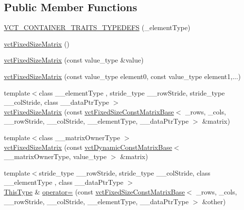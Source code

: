 \subsection*{Public Member Functions}
\begin{DoxyCompactItemize}
\item 
\hyperlink{classvct_fixed_size_matrix_a78c5d283ff740706b19aa20a26f2aa72}{V\-C\-T\-\_\-\-C\-O\-N\-T\-A\-I\-N\-E\-R\-\_\-\-T\-R\-A\-I\-T\-S\-\_\-\-T\-Y\-P\-E\-D\-E\-F\-S} (\-\_\-element\-Type)
\item 
\hyperlink{classvct_fixed_size_matrix_a8e739eb559d9d6e89327760d4d730dc6}{vct\-Fixed\-Size\-Matrix} ()
\item 
\hyperlink{classvct_fixed_size_matrix_ab1a36da72bbaa940a6ecb8b5948cefd5}{vct\-Fixed\-Size\-Matrix} (const value\-\_\-type \&value)
\item 
\hyperlink{classvct_fixed_size_matrix_adb59d89c0f4e11f97357682f5063457b}{vct\-Fixed\-Size\-Matrix} (const value\-\_\-type element0, const value\-\_\-type element1,...)
\item 
{\footnotesize template$<$class \-\_\-\-\_\-element\-Type , stride\-\_\-type \-\_\-\-\_\-row\-Stride, stride\-\_\-type \-\_\-\-\_\-col\-Stride, class \-\_\-\-\_\-data\-Ptr\-Type $>$ }\\\hyperlink{classvct_fixed_size_matrix_a98b4158359ed5e4cb02c41a19b0c39a1}{vct\-Fixed\-Size\-Matrix} (const \hyperlink{classvct_fixed_size_const_matrix_base}{vct\-Fixed\-Size\-Const\-Matrix\-Base}$<$ \-\_\-rows, \-\_\-cols, \-\_\-\-\_\-row\-Stride, \-\_\-\-\_\-col\-Stride, \-\_\-\-\_\-element\-Type, \-\_\-\-\_\-data\-Ptr\-Type $>$ \&matrix)
\item 
{\footnotesize template$<$class \-\_\-\-\_\-matrix\-Owner\-Type $>$ }\\\hyperlink{classvct_fixed_size_matrix_a4dcca7d8dfa0b09c2421c3a8929446c1}{vct\-Fixed\-Size\-Matrix} (const \hyperlink{classvct_dynamic_const_matrix_base}{vct\-Dynamic\-Const\-Matrix\-Base}$<$ \-\_\-\-\_\-matrix\-Owner\-Type, value\-\_\-type $>$ \&matrix)
\item 
{\footnotesize template$<$stride\-\_\-type \-\_\-\-\_\-row\-Stride, stride\-\_\-type \-\_\-\-\_\-col\-Stride, class \-\_\-\-\_\-element\-Type , class \-\_\-\-\_\-data\-Ptr\-Type $>$ }\\\hyperlink{classvct_fixed_size_const_matrix_base_a7ec66a96ed7e08ce9ff54093133c9d8d}{This\-Type} \& \hyperlink{classvct_fixed_size_matrix_af89b7386592f2db08c889328a8c97b1b}{operator=} (const \hyperlink{classvct_fixed_size_const_matrix_base}{vct\-Fixed\-Size\-Const\-Matrix\-Base}$<$ \-\_\-rows, \-\_\-cols, \-\_\-\-\_\-row\-Stride, \-\_\-\-\_\-col\-Stride, \-\_\-\-\_\-element\-Type, \-\_\-\-\_\-data\-Ptr\-Type $>$ \&other)

\end{DoxyCompactItemize}

